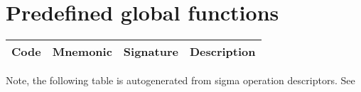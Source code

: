 \section{Predefined global functions}
\label{sec:appendix:primops}

    \tiny
    \begin{longtable}[h]{|l |l | p{.25\linewidth} | p{.5\linewidth} |}
	\hline
Code &   Mnemonic   &  Signature & Description \\
    \hline
    

    \end{longtable}
    \normalsize


Note, the following table is autogenerated from sigma operation descriptors. See 


